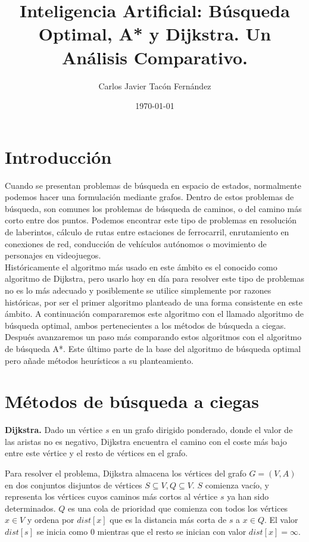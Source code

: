 \documentclass{article}
\title{\textbf{\huge Inteligencia Artificial: Búsqueda Optimal, A* y Dijkstra. Un Análisis Comparativo.}}
\author{Carlos Javier Tacón Fernández}
\date{\today}
\begin{document}
\maketitle

\section{Introducción}
Cuando se presentan problemas de búsqueda en espacio de estados, normalmente podemos hacer una formulación mediante grafos. Dentro de estos problemas de búsqueda, son comunes los problemas de búsqueda de caminos, o del camino más corto entre dos puntos. Podemos encontrar este tipo de problemas en resolución de laberintos, cálculo de rutas entre estaciones de ferrocarril, enrutamiento en conexiones de red, conducción de vehículos autónomos o movimiento de personajes en videojuegos.
\\

Históricamente el algoritmo más usado en este ámbito es el conocido como algoritmo de Dijkstra, pero usarlo hoy en día para resolver este tipo de problemas no es lo más adecuado y posiblemente se utilice simplemente por razones históricas, por ser el primer algoritmo planteado de una forma consistente en este ámbito. A continuación compararemos este algoritmo con el llamado algoritmo de búsqueda optimal, ambos pertenecientes a los métodos de búsqueda a ciegas. Después avanzaremos un paso más comparando estos algoritmos con el algoritmo de búsqueda A*. Este último parte de la base del algoritmo de búsqueda optimal pero añade métodos heurísticos a su planteamiento.


\section{Métodos de búsqueda a ciegas}
\textbf{Dijkstra.} Dado un vértice $s$ en un grafo dirigido ponderado, donde el valor de las aristas no es negativo, Dijkstra encuentra el camino con el coste más bajo entre este vértice y el resto de vértices en el grafo. 

Para resolver el problema, Dijkstra almacena los vértices del grafo $G = (V, A)$ en dos conjuntos disjuntos de vértices $S \subseteq V, Q \subseteq V$. $S$ comienza vacío, y representa los vértices cuyos caminos más cortos al vértice $s$ ya han sido determinados. $Q$ es una cola de prioridad que comienza con todos los vértices $x \in V$ y ordena por $dist[x]$ que es la distancia más corta de $s$ a $x \in Q$. El valor $dist[s]$ se inicia como $0$ mientras que el resto se inician con valor $dist[x]=\infty$.
\end{document}
